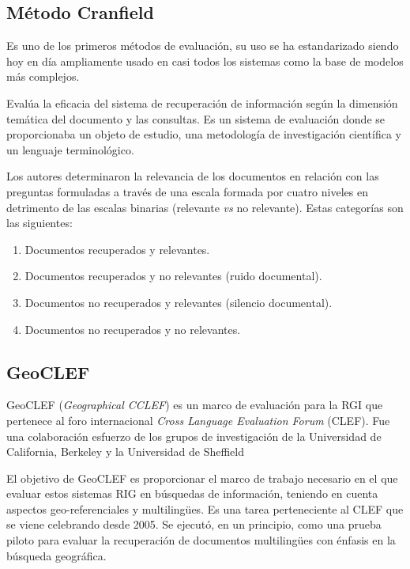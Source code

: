 \subsection{Método Cranfield}\label{sec:Cranfield}

Es uno de los primeros métodos de evaluación, su uso se ha estandarizado 
siendo hoy en día ampliamente usado en casi todos los sistemas como la base de
modelos más complejos.

Evalúa la eficacia del sistema de recuperación de información según la
dimensión temática del documento y las consultas. Es un sistema de evaluación
donde se proporcionaba un objeto de estudio, una metodología de investigación
científica y un lenguaje terminológico.

Los autores determinaron la relevancia de los documentos en relación
con las preguntas formuladas a través de una escala formada por cuatro niveles
en detrimento de las escalas binarias (relevante \emph{vs} no relevante).
Estas categorías son las siguientes: 

\begin{enumerate}
    \item Documentos recuperados y relevantes.
    \item Documentos recuperados y no relevantes (ruido documental).
    \item Documentos no recuperados y relevantes (silencio documental).
    \item Documentos no recuperados y no relevantes. 
\end{enumerate}

\subsection{GeoCLEF}\label{sec:GeoCLEF}

GeoCLEF (\emph{Geographical CCLEF}) es un marco de evaluación para la RGI que
pertenece al foro internacional \emph{Cross Language Evaluation Forum} (CLEF).
Fue una colaboración esfuerzo de los grupos de investigación de la Universidad
de California, Berkeley y la Universidad de Sheffield

El objetivo de GeoCLEF es proporcionar el marco de trabajo necesario en el que
evaluar estos sistemas RIG en búsquedas de información, teniendo en cuenta
aspectos geo-referenciales y multiling\"ues. Es una tarea perteneciente al CLEF
que se viene celebrando desde 2005. Se ejecutó, en un principio, como una
prueba piloto para evaluar la recuperación de documentos multiling\"ues con
énfasis en la búsqueda geográfica.

\newpage
